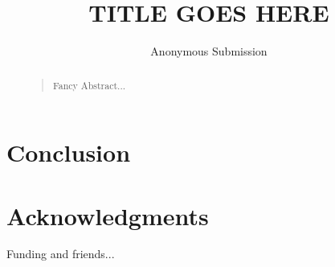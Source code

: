 \documentclass[letterpaper]{article}
\begin{document}
\title{TITLE GOES HERE}
\author{Anonymous Submission}
\maketitle

\begin{abstract}
\begin{quote}
Fancy Abstract...
\end{quote}
\end{abstract}






\section{Conclusion}

\section{Acknowledgments}
Funding and friends...



\end{document}

